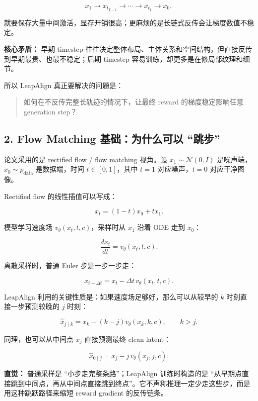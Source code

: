 \[
x_1 \rightarrow x_{t_{T-1}} \rightarrow \cdots \rightarrow x_{t_1} \rightarrow x_0,
\]

就要保存大量中间激活，显存开销很高；更麻烦的是长链式反传会让梯度数值不稳定。

\begin{warnbox}
\textbf{核心矛盾：} 早期 timestep 往往决定整体布局、主体关系和空间结构，但直接反传到早期最贵、也最不稳定；后期 timestep 容易训练，却更多是在修局部纹理和细节。
\end{warnbox}

所以 LeapAlign 真正要解决的问题是：

\begin{quote}
如何在不反传完整长轨迹的情况下，让最终 reward 的梯度稳定影响任意 generation step？
\end{quote}

\subsection{2. Flow Matching 基础：为什么可以 ``跳步''}

论文采用的是 rectified flow / flow matching 视角。设 \(x_1\sim\mathcal{N}(0,I)\) 是噪声端，\(x_0\sim p_{\mathrm{data}}\) 是数据端，时间 \(t\in[0,1]\)，其中 \(t=1\) 对应噪声，\(t=0\) 对应干净图像。

Rectified flow 的线性插值可以写成：

\[
x_t = (1-t)x_0 + t x_1.
\]

模型学习速度场 \(v_{\theta}(x_t,t,c)\)，采样时从 \(x_1\) 沿着 ODE 走到 \(x_0\)：

\[
\frac{dx_t}{dt}=v_{\theta}(x_t,t,c).
\]

离散采样时，普通 Euler 步是一步一步走：

\[
x_{t-\Delta t}
=
x_t - \Delta t\, v_{\theta}(x_t,t,c).
\]

LeapAlign 利用的关键性质是：如果速度场足够好，那么可以从较早的 \(k\) 时刻直接一步预测较晚的 \(j\) 时刻：

\[
\hat{x}_{j\mid k}
=
x_k - (k-j)v_{\theta}(x_k,k,c),
\qquad k>j.
\]

同理，也可以从中间点 \(x_j\) 直接预测最终 clean latent：

\[
\hat{x}_{0\mid j}
=
x_j - j\,v_{\theta}(x_j,j,c).
\]

\begin{intubox}
\textbf{直觉：} 普通采样是 ``小步走完整条路''；LeapAlign 训练时构造的是 ``从早期点直接跳到中间点，再从中间点直接跳到终点''。它不声称推理一定少走这些步，而是用这种跳跃路径来缩短 reward gradient 的反传链条。
\end{intubox}

